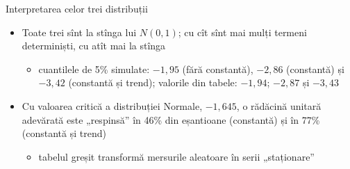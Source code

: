 \begin{frame}{Interpretarea celor trei distribuții}
\itemsize{\small}
\begin{itemize}
    \item Toate trei sînt la stînga lui $N(0, 1)$; cu cît sînt mai mulți termeni determiniști, cu atît mai la stînga
    \begin{itemize}
        \item cuantilele de 5\% simulate: $\ensuremath{-}1{,}95$ (fără constantă), $\ensuremath{-}2{,}86$ (constantă) și $\ensuremath{-}3{,}42$ (constantă și trend); valorile din tabele: $\ensuremath{-}1{,}94$; $\ensuremath{-}2{,}87$ și $\ensuremath{-}3{,}43$
    \end{itemize}
    \item Cu valoarea critică a distribuției Normale, $-1{,}645$, o rădăcină unitară adevărată este „respinsă” în 46\% din eșantioane (constantă) și în 77\% (constantă și trend)
    \begin{itemize}
        \item tabelul greșit transformă mersurile aleatoare în serii „staționare”
    \end{itemize}
\end{itemize}
\end{frame}


